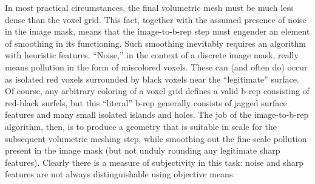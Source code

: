 In most practical circumstances, the final volumetric mesh
must be much less dense than the voxel grid.  This fact, together with the assumed presence of noise in the image mask, means that the image-to-b-rep step must engender an element of smoothing in its functioning.  Such smoothing inevitably requires an algorithm with heuristic features.  ``Noise,'' in the context of a discrete image mask, really means pollution in the form of miscolored voxels.  These can (and often do) occur as isolated red voxels surrounded by black voxels near the ``legitimate'' surface.  Of course, any arbitrary coloring of a voxel grid defines a valid b-rep consisting of red-black surfels, but this ``literal'' b-rep generally consists of jagged surface features and many small isolated islands and holes.  The job of the image-to-b-rep algorithm, then, is to produce a geometry that is suitable in scale for the subsequent volumetric meshing step, while smoothing out the fine-scale pollution present in the image mask (but not unduly rounding any legitimate sharp features).  Clearly there is a measure of subjectivity in this task:  noise and sharp features are not always distinguishable using objective means.
